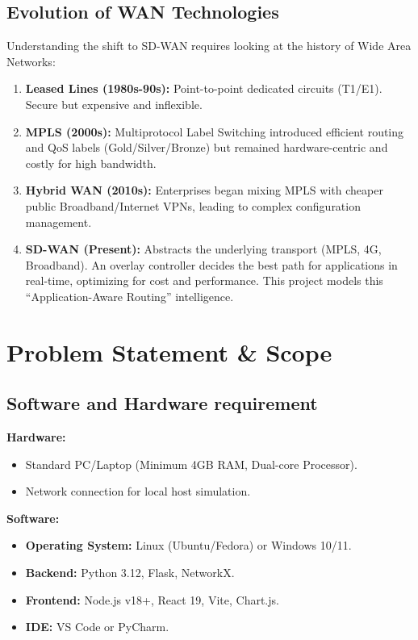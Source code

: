 \documentclass[12pt]{report}
\begin{document}
\section{Evolution of WAN Technologies}
Understanding the shift to SD-WAN requires looking at the history of Wide Area Networks:
\begin{enumerate}
    \item \textbf{Leased Lines (1980s-90s):} Point-to-point dedicated circuits (T1/E1). Secure but expensive and inflexible.
    \item \textbf{MPLS (2000s):} Multiprotocol Label Switching introduced efficient routing and QoS labels (Gold/Silver/Bronze) but remained hardware-centric and costly for high bandwidth.
    \item \textbf{Hybrid WAN (2010s):} Enterprises began mixing MPLS with cheaper public Broadband/Internet VPNs, leading to complex configuration management.
    \item \textbf{SD-WAN (Present):} Abstracts the underlying transport (MPLS, 4G, Broadband). An overlay controller decides the best path for applications in real-time, optimizing for cost and performance. This project models this ``Application-Aware Routing'' intelligence.
\end{enumerate}

\chapter{Problem Statement \& Scope}

\section{Software and Hardware requirement}
\textbf{Hardware:}
\begin{itemize}
    \item Standard PC/Laptop (Minimum 4GB RAM, Dual-core Processor).
    \item Network connection for local host simulation.
\end{itemize}

\textbf{Software:}
\begin{itemize}
    \item \textbf{Operating System:} Linux (Ubuntu/Fedora) or Windows 10/11.
    \item \textbf{Backend:} Python 3.12, Flask, NetworkX.
    \item \textbf{Frontend:} Node.js v18+, React 19, Vite, Chart.js.
    \item \textbf{IDE:} VS Code or PyCharm.
\end{itemize}
\end{document}
